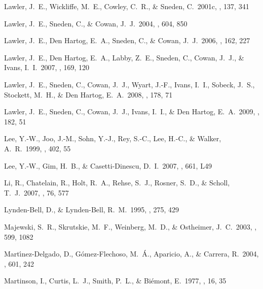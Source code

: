 \documentclass{emulateapj}
\begin{document}
\begin{thebibliography}{}
 Lawler, J.~E., 
Wickliffe, M.~E., Cowley, C.~R., \& Sneden, C.\ 2001c, \apjs, 137, 341 

 Lawler, J.~E., Sneden, 
C., \& Cowan, J.~J.\ 2004, \apj, 604, 850 

 Lawler, J.~E., Den 
Hartog, E.~A., Sneden, C., \& Cowan, J.~J.\ 2006, \apjs, 162, 227 

 Lawler, J.~E., Den 
Hartog, E.~A., Labby, Z.~E., Sneden, C., Cowan, J.~J., 
\& Ivans, I.~I.\ 2007, \apjs, 169, 120 

 Lawler, J.~E., Sneden, 
C., Cowan, J.~J., Wyart, J.-F., Ivans, I.~I., Sobeck, J.~S., Stockett, 
M.~H., \& Den Hartog, E.~A.\ 2008, \apjs, 178, 71 

 Lawler, J.~E., Sneden, 
C., Cowan, J.~J., Ivans, I.~I., \& Den Hartog, E.~A.\ 2009, \apjs, 182, 51 

 Lee, Y.-W., Joo, J.-M., 
Sohn, Y.-J., Rey, S.-C., Lee, H.-C., \& Walker, A.~R.\ 1999, \nat, 402, 55 

 Lee, Y.-W., Gim, H.~B., 
\& Casetti-Dinescu, D.~I.\ 2007, \apjl, 661, L49 


 Li, R., Chatelain, R., Holt, 
R.~A., Rehse, S.~J., Rosner, S.~D., 
\& Scholl, T.~J.\ 2007, \physscr, 76, 577 


 Lynden-Bell, D., 
\& Lynden-Bell, R.~M.\ 1995, \mnras, 275, 429 

 Majewski, S.~R., 
Skrutskie, M.~F., Weinberg, M.~D., 
\& Ostheimer, J.~C.\ 2003, \apj, 599, 1082 

Mart{\'{\i}}nez-Delgado, D., G{\'o}mez-Flechoso, M.~{\'A}., Aparicio, A., 
\& Carrera, R.\ 2004, \apj, 601, 242 

 Martinson, I., 
Curtis, L.~J., Smith, P.~L., \& Bi{\'e}mont, E.\ 1977, \physscr, 16, 35 


\end{thebibliography}
\end{document}
